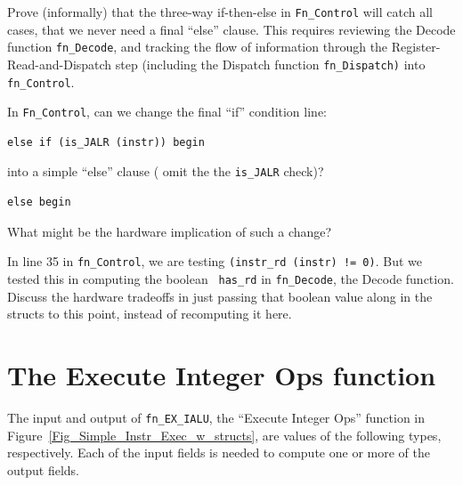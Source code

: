 \vspace*{2ex}

\hdivider

\Exercise

Prove (informally) that the three-way if-then-else in
\verb|Fn_Control| will catch all cases, {\ie} that we never need a
final ``else'' clause.  This requires reviewing the Decode function
\verb|fn_Decode|, and tracking the flow of information through the
Register-Read-and-Dispatch step (including the Dispatch function
\verb|fn_Dispatch)| into \verb|fn_Control|.

\Exercise

In \verb|Fn_Control|, can we change the final ``if'' condition line:

{\small
\begin{Verbatim}[frame=single]
   else if (is_JALR (instr)) begin
\end{Verbatim}
}

into a simple ``else'' clause ({\ie} omit the the \verb|is_JALR| check)?

{\small
\begin{Verbatim}[frame=single]
   else begin
\end{Verbatim}
}

What might be the hardware implication of such a change?

\Exercise

In line 35 in {\tt fn\_Control}, we are testing {\tt (instr\_rd
(instr) != 0)}.  But we tested this in computing the boolean {\tt
has\_rd} in {\tt fn\_Decode}, the Decode function.  Discuss the hardware
tradeoffs in just passing that boolean value along in the structs to
this point, instead of recomputing it here.

\Endexercise


\section{The Execute Integer Ops function}

\label{Sec_EXI_function}


The input and output of \verb|fn_EX_IALU|, the ``Execute Integer Ops''
function in Figure~\ref{Fig_Simple_Instr_Exec_w_structs}, are values
of the following types, respectively.  Each of the input fields is
needed to compute one or more of the output fields.


